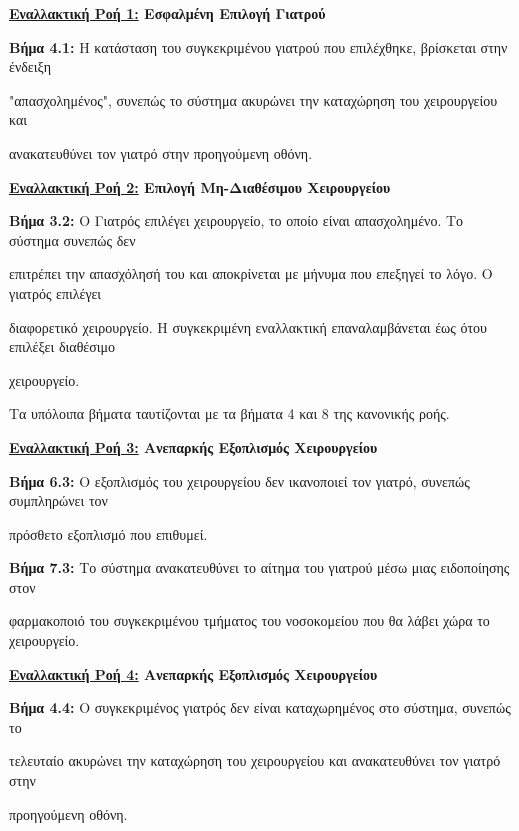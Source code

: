 \documentclass{article}
\begin{document}
\textbf{\underline{Εναλλακτική Ροή 1:} Εσφαλμένη Επιλογή Γιατρού} \vspace{0.2cm} 

\par \textbf{Βήμα 4.1:} Η κατάσταση του συγκεκριμένου γιατρού που επιλέχθηκε, βρίσκεται στην ένδειξη \par "απασχολημένος", συνεπώς το σύστημα ακυρώνει την καταχώρηση του χειρουργείου και \par ανακατευθύνει τον γιατρό στην προηγούμενη οθόνη. \vspace{0.2cm}

\textbf{\underline{Εναλλακτική Ροή 2:} Επιλογή Μη-Διαθέσιμου Χειρουργείου} \vspace{0.2cm} 
\par \textbf{Βήμα 3.2:} Ο Γιατρός επιλέγει χειρουργείο, το οποίο είναι απασχολημένο. Το σύστημα συνεπώς δεν \par επιτρέπει την απασχόλησή του και αποκρίνεται με μήνυμα που επεξηγεί το λόγο. Ο γιατρός επιλέγει \par διαφορετικό χειρουργείο. Η συγκεκριμένη εναλλακτική επαναλαμβάνεται έως ότου επιλέξει διαθέσιμο \par χειρουργείο. \vspace{0.2cm}

\par Τα υπόλοιπα βήματα ταυτίζονται με τα βήματα 4 και 8 της κανονικής ροής. \vspace{0.2cm}

\textbf{\underline{Εναλλακτική Ροή 3:} Ανεπαρκής Εξοπλισμός Χειρουργείου} \vspace{0.2cm} 
\par \textbf{Βήμα 6.3:} Ο εξοπλισμός του χειρουργείου δεν ικανοποιεί τον γιατρό, συνεπώς συμπληρώνει τον \par πρόσθετο εξοπλισμό που επιθυμεί.
\par \textbf{Βήμα 7.3:} Το σύστημα ανακατευθύνει το αίτημα του γιατρού μέσω μιας ειδοποίησης στον \par φαρμακοποιό του συγκεκριμένου τμήματος του νοσοκομείου που θα λάβει χώρα το χειρουργείο. \vspace{0.2cm}

\textbf{\underline{Εναλλακτική Ροή 4:} Ανεπαρκής Εξοπλισμός Χειρουργείου} \vspace{0.2cm} 
\par \textbf{Βήμα 4.4:} Ο συγκεκριμένος γιατρός δεν είναι καταχωρημένος στο σύστημα, συνεπώς το \par τελευταίο ακυρώνει την καταχώρηση του χειρουργείου και ανακατευθύνει τον γιατρό στην \par προηγούμενη οθόνη.
\end{document}
